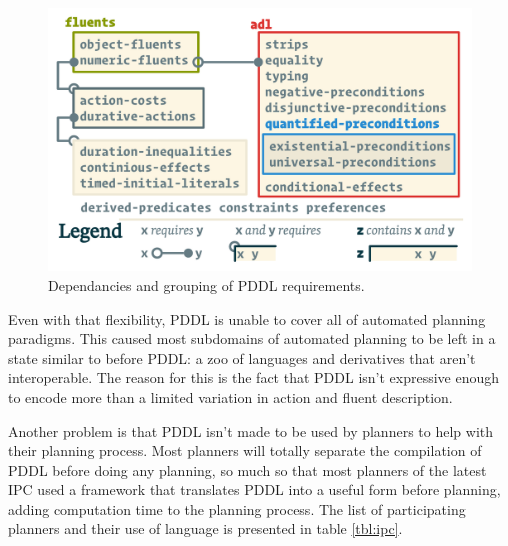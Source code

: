 \documentclass[11pt,a4paper,twoside,openright,titlepage,numbers=noenddot,headinclude,cleardoublepage=empty,openany]{scrreprt}
\theoremstyle{plain}
\theoremstyle{definition}
\theoremstyle{remark}
\begin{document}
\begin{figure}
\hypertarget{fig:pddl_req}{%
\centering
\includegraphics{./tex2pdf.-0b80fea6fd6da7f9/5e701553843ab00933d8df30f98736e12016e3f9.pdf}
\caption{Dependancies and grouping of PDDL
requirements.}\label{fig:pddl_req}
}
\end{figure}

Even with that flexibility, PDDL is unable to cover all of automated
planning paradigms. This caused most subdomains of automated planning to
be left in a state similar to before PDDL: a zoo of languages and
derivatives that aren't interoperable. The reason for this is the fact
that PDDL isn't expressive enough to encode more than a limited
variation in action and fluent description.

Another problem is that PDDL isn't made to be used by planners to help
with their planning process. Most planners will totally separate the
compilation of PDDL before doing any planning, so much so that most
planners of the latest IPC used a framework that translates PDDL into a
useful form before planning, adding computation time to the planning
process. The list of participating planners and their use of language is
presented in table \ref{tbl:ipc}.
\end{document}
